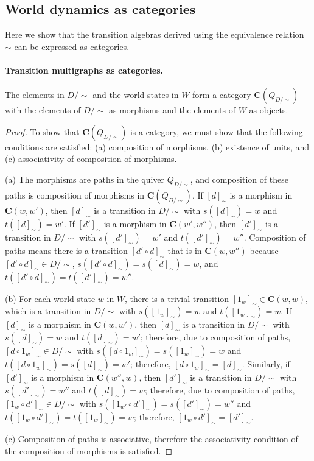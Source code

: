 \subsection{World dynamics as categories}

Here we show that the transition algebras derived using the equivalence relation $\sim$ can be expressed as categories.

\paragraph{Transition multigraphs as categories.}

\begin{proposition}
    The elements in $D/\sim$ and the world states in $W$ form a category $\textbf{C}(Q_{D/\sim})$ with the elements of $D/\sim$ as morphisms and the elements of $W$ as objects.
\end{proposition}\begin{proof}
    To show that $\textbf{C}(Q_{D/\sim})$ is a category, we must show that the following conditions are satisfied: (a) composition of morphisms, (b) existence of units, and (c) associativity of composition of morphisms.
    
    (a) The morphisms are paths in the quiver $Q_{D/\sim}$, and composition of these paths is composition of morphisms in $\textbf{C}(Q_{D/\sim})$.
    If $[d]_{\sim}$ is a morphism in $\textbf{C}(w,w')$, then $[d]_{\sim}$ is a transition in $D/\sim$ with $s([d]_{\sim})=w$ and $t([d]_{\sim})=w'$.
    If $[d']_{\sim}$ is a morphism in $\textbf{C}(w',w'')$, then $[d']_{\sim}$ is a transition in $D/\sim$ with $s([d']_{\sim})=w'$ and $t([d']_{\sim})=w''$.
    Composition of paths means there is a transition $[d' \circ d]_{\sim}$ that is in $\textbf{C}(w, w'')$ because $[d' \circ d]_{\sim} \in D/\sim$, $s([d' \circ d]_{\sim})=s([d]_{\sim})=w$, and $t([d' \circ d]_{\sim})=t([d']_{\sim})=w''$.
    
    (b) For each world state $w$ in $W$, there is a trivial transition $[1_{w}]_{\sim} \in \textbf{C}(w,w)$, which is a transition in $D/\sim$ with $s([1_{w}]_{\sim})=w$ and $t([1_{w}]_{\sim})=w$.
    If $[d]_{\sim}$ is a morphism in $\textbf{C}(w,w')$, then $[d]_{\sim}$ is a transition in $D/\sim$ with $s([d]_{\sim})=w$ and $t([d]_{\sim})=w'$; therefore, due to composition of paths, $[d \circ 1_{w}]_{\sim} \in D/\sim$ with $s([d \circ 1_{w}]_{\sim})=s([1_{w}]_{\sim})=w$ and $t([d \circ 1_{w}]_{\sim})=s([d]_{\sim})=w'$; therefore, $[d \circ 1_{w}]_{\sim} = [d]_{\sim}$.
    Similarly, if $[d']_{\sim}$ is a morphism in $\textbf{C}(w'',w)$, then $[d']_{\sim}$ is a transition in $D/\sim$ with $s([d']_{\sim})=w''$ and $t([d]_{\sim})=w$; therefore, due to composition of paths, $[1_{w} \circ d']_{\sim} \in D/\sim$ with $s([1_{w'} \circ d']_{\sim})=s([d']_{\sim})=w''$ and $t([1_{w} \circ d']_{\sim})=t([1_{w}]_{\sim})=w$; therefore, $[1_{w} \circ d']_{\sim} = [d']_{\sim}$.
    
    (c) Composition of paths is associative, therefore the associativity condition of the composition of morphisms is satisfied.
\end{proof}

